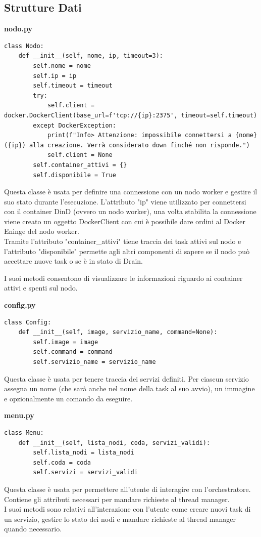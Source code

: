 \documentclass[12pt,a4paper]{article}
\begin{document}
\subsection{Strutture Dati}
\begin{center}
\textbf{nodo.py}
\end{center}
\begin{verbatim}
class Nodo:
    def __init__(self, nome, ip, timeout=3):
        self.nome = nome
        self.ip = ip
        self.timeout = timeout
        try:
            self.client = docker.DockerClient(base_url=f'tcp://{ip}:2375', timeout=self.timeout)
        except DockerException:
            print(f"Info> Attenzione: impossibile connettersi a {nome} ({ip}) alla creazione. Verrà considerato down finché non risponde.")
            self.client = None
        self.container_attivi = {}
        self.disponibile = True
\end{verbatim}
Questa classe è usata per definire una connessione con un nodo worker e gestire il suo stato durante l'esecuzione. L'attributo "ip" viene utilizzato per connettersi con il container DinD (ovvero un nodo worker), una volta stabilita la connessione viene creato un oggetto DockerClient con cui è possibile dare ordini al Docker Eninge del nodo worker.\\
Tramite l'attributo "container\_attivi" tiene traccia dei task attivi sul nodo e l'attributo "disponibile" permette agli altri componenti di sapere se il nodo può accettare nuove task o se è in stato di Drain.

I suoi metodi consentono di visualizzare le informazioni riguardo ai container attivi e spenti sul nodo.
\begin{center}
\textbf{config.py}
\end{center}
\begin{verbatim}
class Config:
    def __init__(self, image, servizio_name, command=None):
        self.image = image
        self.command = command
        self.servizio_name = servizio_name
\end{verbatim}
Questa classe è usata per tenere traccia dei servizi definiti. Per ciascun servizio assegna un nome (che sarà anche nel nome della task al suo avvio), un immagine e opzionalmente un comando da eseguire. 
\begin{center}
\textbf{menu.py}
\end{center}
\begin{verbatim}
class Menu:
    def __init__(self, lista_nodi, coda, servizi_validi):
        self.lista_nodi = lista_nodi
        self.coda = coda
        self.servizi = servizi_validi
\end{verbatim}
Questa classe è usata per permettere all'utente di interagire con l'orchestratore. Contiene gli attributi necessari per mandare richieste al thread manager.\\
I suoi metodi sono relativi all'interazione con l'utente come creare nuovi task di un servizio, gestire lo stato dei nodi e mandare richieste al thread manager quando necessario.
\end{document}

